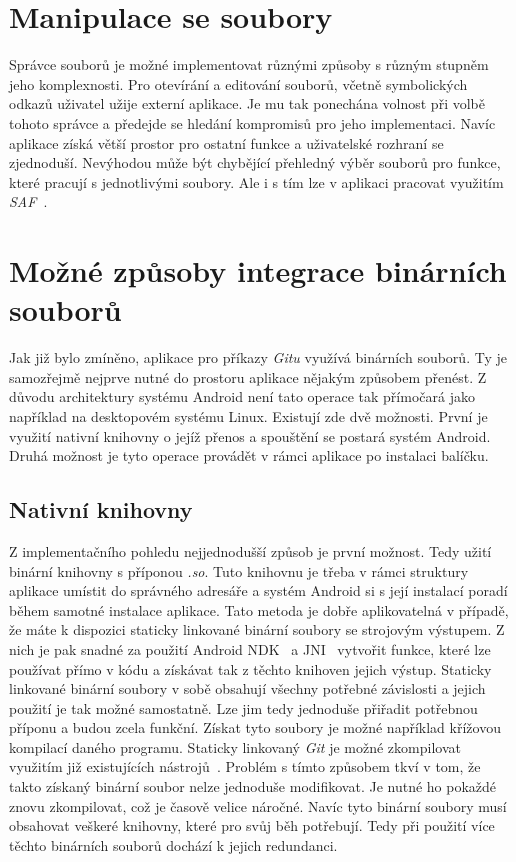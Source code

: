 \section{Manipulace se soubory}
Správce souborů je možné implementovat různými způsoby s různým stupněm jeho komplexnosti. Pro otevírání a editování souborů, včetně symbolických odkazů uživatel užije externí aplikace. Je mu tak ponechána volnost při volbě tohoto správce a předejde se hledání kompromisů pro jeho implementaci. Navíc aplikace  získá větší prostor pro ostatní funkce a uživatelské rozhraní se zjednoduší. Nevýhodou může být chybějící přehledný výběr souborů pro funkce, které pracují s jednotlivými soubory. Ale i s tím lze v aplikaci pracovat využitím \emph{SAF~}.

\section{Možné způsoby integrace binárních souborů}
Jak již bylo zmíněno, aplikace pro příkazy \emph{Gitu} využívá binárních souborů. Ty je samozřejmě nejprve nutné do prostoru aplikace nějakým způsobem přenést. Z důvodu architektury systému Android není tato operace tak přímočará jako například na desktopovém systému Linux. Existují zde dvě možnosti. První je využití nativní knihovny o jejíž přenos a spouštění se postará systém Android. Druhá možnost je tyto operace provádět v rámci aplikace po instalaci balíčku.

    \subsection{Nativní knihovny}
    Z implementačního pohledu nejjednodušší způsob je první možnost. Tedy užití binární knihovny s příponou \emph{.so}. Tuto knihovnu je třeba v rámci struktury aplikace umístit do správného adresáře a systém Android si s její instalací poradí během samotné instalace aplikace. Tato metoda je dobře aplikovatelná v případě, že máte k dispozici staticky linkované binární soubory se strojovým výstupem. Z nich je pak snadné za použití Android NDK~ a JNI~ vytvořit funkce, které lze používat přímo v kódu a získávat tak z těchto knihoven jejich výstup. Staticky linkované binární soubory v sobě obsahují všechny potřebné závislosti a jejich použití je tak možné samostatně. Lze jim tedy jednoduše přiřadit potřebnou příponu a budou zcela funkční. Získat tyto soubory je možné například křížovou kompilací daného programu. Staticky linkovaný \emph{Git} je možné zkompilovat využitím již existujících nástrojů~. Problém s tímto způsobem tkví v tom, že takto získaný binární soubor nelze jednoduše modifikovat. Je nutné ho pokaždé znovu zkompilovat, což je časově velice náročné. Navíc tyto binární soubory musí obsahovat veškeré knihovny, které pro svůj běh potřebují. Tedy při použití více těchto binárních souborů dochází k jejich redundanci.

